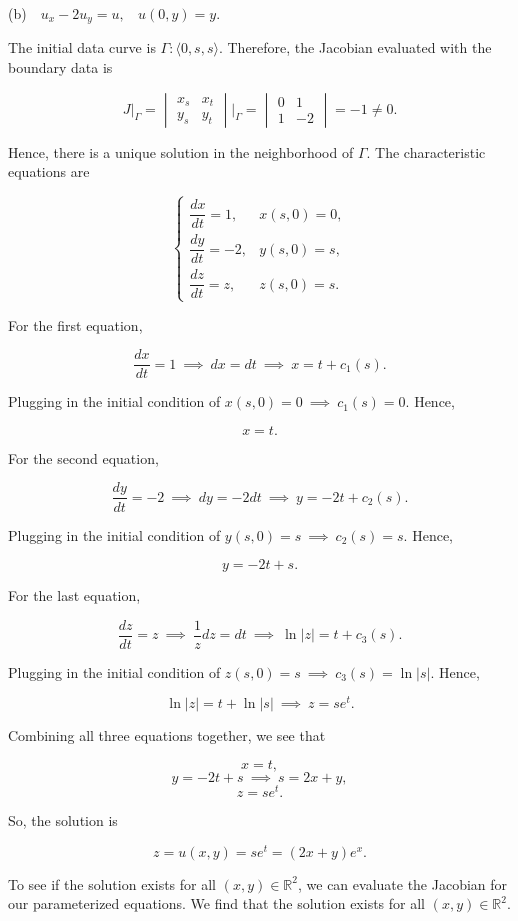 \documentclass{article}
\begin{document}
\begin{flushleft}
(b)~~$u_x-2u_y=u,~~~~ u(0,y)=y.$ 

The initial data curve is $\Gamma: \langle 0,s,s \rangle$. Therefore, the Jacobian evaluated with the boundary data is

$$J\Bigg|_\Gamma=\begin{vmatrix}
x_s & x_t \\
y_s & y_t
\end{vmatrix}\Bigg|_\Gamma=\begin{vmatrix}
0 & 1 \\
1 & -2
\end{vmatrix}=-1 \neq 0.$$

Hence, there is a unique solution in the neighborhood of $\Gamma$. The characteristic equations are 

\[ \begin{cases} 
      \dfrac{dx}{dt}=1, &  x(s,0)=0, \\[1em]
      \dfrac{dy}{dt}=-2, & y(s,0)=s, \\[1em] 
      \dfrac{dz}{dt}=z, & z(s,0)=s.
   \end{cases}
\]

For the first equation,

$$\frac{dx}{dt}=1 ~\implies~ dx = dt ~\implies~ x=t+c_1(s).$$

Plugging in the initial condition of $ x(s,0)=0 ~\implies~  c_1(s)=0$. Hence,

$$x=t.$$

For the second equation,

$$\frac{dy}{dt}=-2 ~\implies~ dy = -2dt ~\implies~ y=-2t+c_2(s).$$

Plugging in the initial condition of $ y(s,0)=s ~\implies~  c_2(s)=s$. Hence,

$$y=-2t+s.$$

For the last equation,

$$\frac{dz}{dt}=z ~\implies~ \frac{1}{z}dz = dt ~\implies~ \ln{|z|}=t+c_3(s).$$

Plugging in the initial condition of $ z(s,0)=s ~\implies~  c_3(s)=\ln{|s|}$. Hence,

$$ \ln{|z|}=t+\ln{|s|} ~\implies~ z=se^t.$$

Combining all three equations together, we see that

$$x=t,$$
$$y=-2t+s ~\implies~ s = 2x+y,$$
$$z=se^t.$$

So, the solution is

$$z=u(x,y)=se^t=(2x+y)e^x.$$

To see if the solution exists for all $(x,y)\in\mathbb R^2$, we can evaluate the Jacobian for our parameterized equations. We find that the solution exists for all $(x,y)\in\mathbb R^2$.


\end{flushleft}
\end{document}
